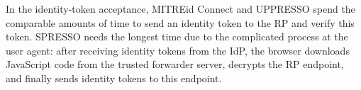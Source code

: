 In the identity-token acceptance,
 MITREid Connect and UPPRESSO spend the comparable amounts of time to send an identity token to the RP and verify this token.
SPRESSO needs the longest time due to the complicated process at the user agent:
        after receiving identity tokens from the IdP,
        the browser downloads JavaScript code from the trusted forwarder server,
            decrypts the RP endpoint, and finally sends identity tokens to this endpoint.



